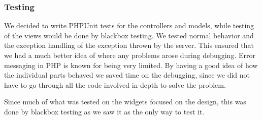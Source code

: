 \subsubsection{Testing}
We decided to write PHPUnit tests for the controllers and models, while testing of the views would be done by blackbox testing. We tested normal behavior and the exception handling of the exception thrown by the server. This ensured that we had a much better idea of where any problems arose during debugging. Error messaging in PHP is known for being very limited. By having a good idea of how the individual parts behaved we saved time on the debugging, since we did not have to go through all the code involved in-depth to solve the problem.

Since much of what was tested on the widgets focused on the design, this was done by blackbox testing as we saw it as the only way to test it.

